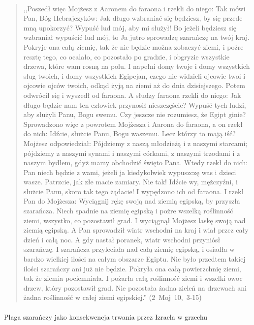 \documentclass[10pt,a4paper,oneside]{article}
\begin{document}
\paragraph{}
\begin{quote}
,,Poszedł więc Mojżesz z Aaronem do faraona i rzekli do niego: Tak mówi Pan, Bóg Hebrajczyków: Jak długo wzbraniać się będziesz, by się przede mną upokorzyć? Wypuść lud mój, aby mi służył! Bo jeżeli będziesz się wzbraniał wypuścić lud mój, to Ja jutro sprowadzę szarańczę na twój kraj. Pokryje ona całą ziemię, tak że nie będzie można zobaczyć ziemi, i pożre resztę tego, co ocalało, co pozostało po gradzie, i obgryzie wszystkie drzewa, które wam rosną na polu. I napełni domy twoje i domy wszystkich sług twoich, i domy wszystkich Egipcjan, czego nie widzieli ojcowie twoi i ojcowie ojców twoich, odkąd żyją na ziemi aż do dnia dzisiejszego. Potem odwrócił się i wyszedł od faraona. A słudzy faraona rzekli do niego: Jak długo będzie nam ten człowiek przynosił nieszczęście? Wypuść tych ludzi, aby służyli Panu, Bogu swemu. Czy jeszcze nie rozumiesz, że Egipt ginie? Sprowadzono więc z powrotem Mojżesza i Aarona do faraona, a on rzekł do nich: Idźcie, służcie Panu, Bogu waszemu. Lecz którzy to mają iść? Mojżesz odpowiedział: Pójdziemy z naszą młodzieżą i z naszymi starcami; pójdziemy z naszymi synami i naszymi córkami, z naszymi trzodami i z naszym bydłem, gdyż mamy obchodzić święto Pana. Wtedy rzekł do nich: Pan niech będzie z wami, jeżeli ja kiedykolwiek wypuszczę was i dzieci wasze. Patrzcie, jak złe macie zamiary. Nie tak! Idźcie wy, mężczyźni, i służcie Panu, skoro tak tego żądacie! I wypędzono ich od faraona. I rzekł Pan do Mojżesza: Wyciągnij rękę swoją nad ziemią egipską, by przyszła szarańcza. Niech spadnie na ziemię egipską i pożre wszelką roślinność ziemi, wszystko, co pozostawił grad. I wyciągnął Mojżesz laskę swoją nad ziemią egipską. A Pan sprowadził wiatr wschodni na kraj i wiał przez cały dzień i całą noc. A gdy nastał poranek, wiatr wschodni przyniósł szarańczę. I szarańcza przyleciała nad całą ziemię egipską, i osiadła w bardzo wielkiej ilości na całym obszarze Egiptu. Nie było przedtem takiej ilości szarańczy ani już nie będzie. Pokryła ona całą powierzchnię ziemi, tak że ziemia pociemniała. I pożarła całą roślinność ziemi i wszelki owoc drzew, który pozostawił grad. Nie pozostała żadna zieleń na drzewach ani żadna roślinność w całej ziemi egipskiej.'' \mbox{(2 Moj 10, 3-15)}
\end{quote}
\paragraph{}
Plaga szarańczy jako konsekwencja trwania przez Izraela w grzechu
\end{document}
